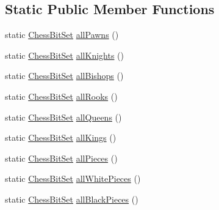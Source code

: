 \subsection*{Static Public Member Functions}
\begin{DoxyCompactItemize}
\item 
static \mbox{\hyperlink{classcom_1_1chess_1_1engine_1_1bitboards_1_1_chess_bit_set}{Chess\+Bit\+Set}} \mbox{\hyperlink{enumcom_1_1chess_1_1engine_1_1bitboards_1_1_bit_board_1_1_piece_aa763af8b0752cd899493161985142191}{all\+Pawns}} ()
\item 
static \mbox{\hyperlink{classcom_1_1chess_1_1engine_1_1bitboards_1_1_chess_bit_set}{Chess\+Bit\+Set}} \mbox{\hyperlink{enumcom_1_1chess_1_1engine_1_1bitboards_1_1_bit_board_1_1_piece_a9c493a89df09b3bc5b6008ffc54ba989}{all\+Knights}} ()
\item 
static \mbox{\hyperlink{classcom_1_1chess_1_1engine_1_1bitboards_1_1_chess_bit_set}{Chess\+Bit\+Set}} \mbox{\hyperlink{enumcom_1_1chess_1_1engine_1_1bitboards_1_1_bit_board_1_1_piece_aaa9cbd20844bb6903b75779f9c4b25a5}{all\+Bishops}} ()
\item 
static \mbox{\hyperlink{classcom_1_1chess_1_1engine_1_1bitboards_1_1_chess_bit_set}{Chess\+Bit\+Set}} \mbox{\hyperlink{enumcom_1_1chess_1_1engine_1_1bitboards_1_1_bit_board_1_1_piece_a24e9444a1916e032e120c9bcbc86d6e5}{all\+Rooks}} ()
\item 
static \mbox{\hyperlink{classcom_1_1chess_1_1engine_1_1bitboards_1_1_chess_bit_set}{Chess\+Bit\+Set}} \mbox{\hyperlink{enumcom_1_1chess_1_1engine_1_1bitboards_1_1_bit_board_1_1_piece_a166dd6537f71a05a3058daf1c5ebc200}{all\+Queens}} ()
\item 
static \mbox{\hyperlink{classcom_1_1chess_1_1engine_1_1bitboards_1_1_chess_bit_set}{Chess\+Bit\+Set}} \mbox{\hyperlink{enumcom_1_1chess_1_1engine_1_1bitboards_1_1_bit_board_1_1_piece_a68264fb3b0e7a939311225c889dc2611}{all\+Kings}} ()
\item 
static \mbox{\hyperlink{classcom_1_1chess_1_1engine_1_1bitboards_1_1_chess_bit_set}{Chess\+Bit\+Set}} \mbox{\hyperlink{enumcom_1_1chess_1_1engine_1_1bitboards_1_1_bit_board_1_1_piece_af98dad5b5843403afab2151c32152834}{all\+Pieces}} ()
\item 
static \mbox{\hyperlink{classcom_1_1chess_1_1engine_1_1bitboards_1_1_chess_bit_set}{Chess\+Bit\+Set}} \mbox{\hyperlink{enumcom_1_1chess_1_1engine_1_1bitboards_1_1_bit_board_1_1_piece_ad537bdb874ee139de609526690eb1cc7}{all\+White\+Pieces}} ()
\item 
static \mbox{\hyperlink{classcom_1_1chess_1_1engine_1_1bitboards_1_1_chess_bit_set}{Chess\+Bit\+Set}} \mbox{\hyperlink{enumcom_1_1chess_1_1engine_1_1bitboards_1_1_bit_board_1_1_piece_aa324a943f21af0f5ab68c71cc2df8a31}{all\+Black\+Pieces}} ()
\end{DoxyCompactItemize}
